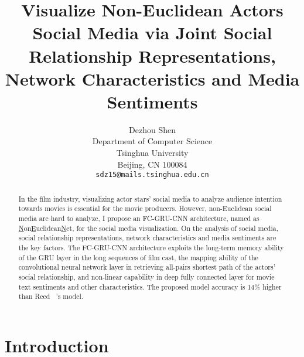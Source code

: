 \documentclass[review]{cvpr}
\begin{document}
\title{Visualize Non-Euclidean Actors Social Media via Joint Social Relationship Representations, Network Characteristics and Media Sentiments}

\author{Dezhou Shen\\
Department of Computer Science\\
Tsinghua University\\
Beijing, CN 100084\\
{\tt\small sdz15@mails.tsinghua.edu.cn}
}

\maketitle


\begin{abstract}

  In the film industry, visualizing actor stars' social media to analyze audience intention towards movies is essential for the movie producers.
  However, non-Euclidean social media are hard to analyze,
  I propose an FC-GRU-CNN architecture, named as \underline{N}on\underline{E}uclidean\underline{N}et, for the social media visualization.
  On the analysis of social media, social relationship representations, network characteristics and media sentiments are the key factors.
  The FC-GRU-CNN architecture exploits the long-term memory ability of the GRU layer in the long sequences of film cast,
  the mapping ability of the convolutional neural network layer in retrieving all-pairs shortest path of the actors' social relationship,
  and non-linear capability in deep fully connected layer for movie text sentiments and other characteristics.
  The proposed model accuracy is 14\% higher than Reed \etal~\cite{reed2016learning}'s model.

\end{abstract}

\section{Introduction}
\end{document}
